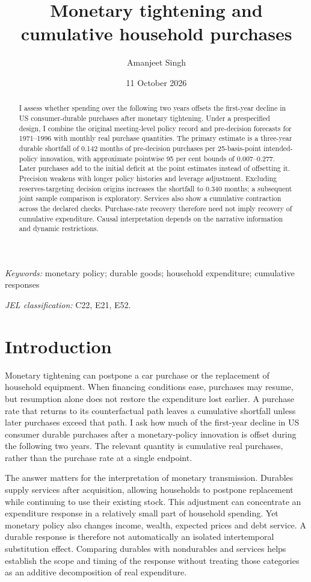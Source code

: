 \documentclass[11pt,a4paper]{article}
\title{\normalfont\mdseries Monetary tightening and\\cumulative household purchases}
\author{Amanjeet Singh}
\date{11 October 2026}
\begin{document}
\maketitle
\begin{abstract}
\noindent I assess whether spending over the following two years offsets the first-year decline in US consumer-durable purchases after monetary tightening. Under a prespecified design, I combine the original meeting-level policy record and pre-decision forecasts for 1971--1996 with monthly real purchase quantities. The primary estimate is a three-year durable shortfall of 0.142 months of pre-decision purchases per 25-basis-point intended-policy innovation, with approximate pointwise 95 per cent bounds of 0.007--0.277. Later purchases add to the initial deficit at the point estimates instead of offsetting it. Precision weakens with longer policy histories and leverage adjustment. Excluding reserves-targeting decision origins increases the shortfall to 0.340 months; a subsequent joint sample comparison is exploratory. Services also show a cumulative contraction across the declared checks. Purchase-rate recovery therefore need not imply recovery of cumulative expenditure. Causal interpretation depends on the narrative information and dynamic restrictions.
\end{abstract}
\noindent\textit{Keywords:} monetary policy; durable goods; household expenditure; cumulative responses
\par\smallskip\noindent\textit{JEL classification:} C22, E21, E52.

\section{Introduction}

Monetary tightening can postpone a car purchase or the replacement of household equipment. When financing conditions ease, purchases may resume, but resumption alone does not restore the expenditure lost earlier. A purchase rate that returns to its counterfactual path leaves a cumulative shortfall unless later purchases exceed that path. I ask how much of the first-year decline in US consumer durable purchases after a monetary-policy innovation is offset during the following two years. The relevant quantity is cumulative real purchases, rather than the purchase rate at a single endpoint.

The answer matters for the interpretation of monetary transmission. Durables supply services after acquisition, allowing households to postpone replacement while continuing to use their existing stock. This adjustment can concentrate an expenditure response in a relatively small part of household spending. Yet monetary policy also changes income, wealth, expected prices and debt service. A durable response is therefore not automatically an isolated intertemporal substitution effect. Comparing durables with nondurables and services helps establish the scope and timing of the response without treating those categories as an additive decomposition of real expenditure.
\end{document}
